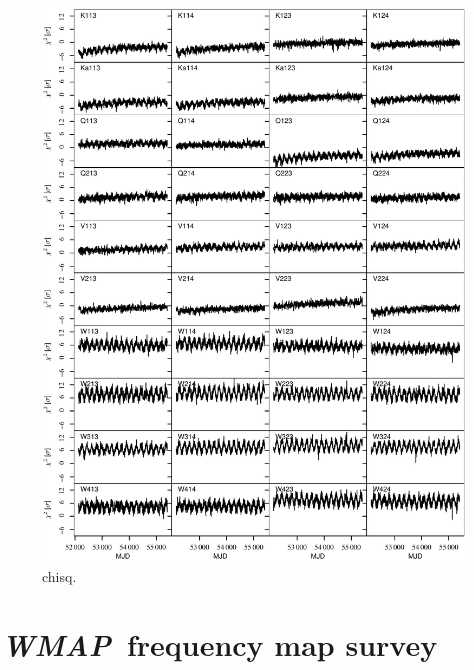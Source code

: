 \documentclass[twocolumn]{../../common/aa}
\def\WMAP{\emph{WMAP}}
\begin{document}
\begin{figure}[p]
	\centering
	\includegraphics[width=\textwidth]{figures/instpar_CG_chisq_v1.pdf}
	\caption{chisq.}
	\label{fig:chisq}
\end{figure}



\section{\WMAP\ frequency map survey}
\label{sec:map_survey}
\end{document}
